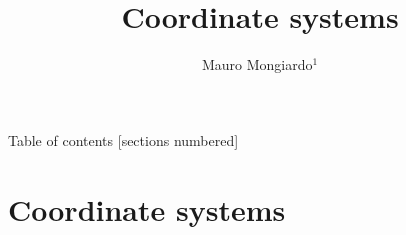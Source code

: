 \documentclass[10pt]{beamer}
\title{Coordinate systems}
\date{}
\author{ Mauro Mongiardo$^1$}
\institute{ $^1$ Department of Engineering, University of Perugia, Perugia, Italy.
}
\begin{document}
\maketitle

\begin{frame}{Table of contents}
  [sections numbered]
  \tableofcontents[hideallsubsections]
\end{frame}


\def\EMspectrum{\centering
\texttt{[image: EMspectrum]}}

\def\atmatt{\centering
\texttt{[image: atmatt3.eps]}}


%



\section{Coordinate systems}
\end{document}
